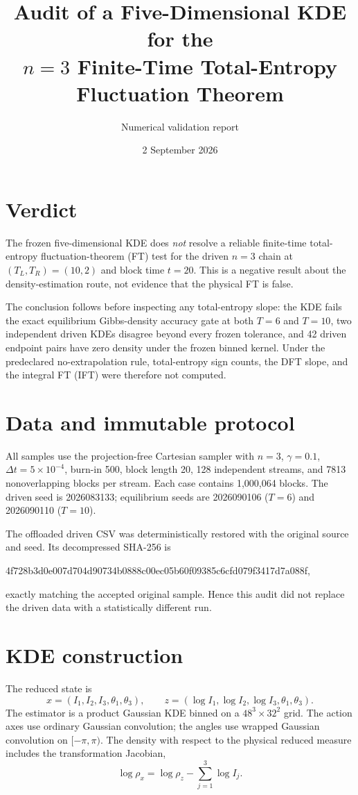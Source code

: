 \documentclass[11pt]{article}
\title{Audit of a Five-Dimensional KDE for the\\
$n=3$ Finite-Time Total-Entropy Fluctuation Theorem}
\author{Numerical validation report}
\date{2 September 2026}
\begin{document}
\maketitle

\section*{Verdict}

The frozen five-dimensional KDE does \emph{not} resolve a reliable finite-time
total-entropy fluctuation-theorem (FT) test for the driven $n=3$ chain at
$(T_L,T_R)=(10,2)$ and block time $t=20$.  This is a negative result about the
density-estimation route, not evidence that the physical FT is false.

The conclusion follows before inspecting any total-entropy slope: the KDE
fails the exact equilibrium Gibbs-density accuracy gate at both $T=6$ and
$T=10$, two independent driven KDEs disagree beyond every frozen tolerance,
and 42 driven endpoint pairs have zero density under the frozen binned kernel.
Under the predeclared no-extrapolation rule, total-entropy sign counts, the DFT
slope, and the integral FT (IFT) were therefore not computed.

\section{Data and immutable protocol}

All samples use the projection-free Cartesian sampler with $n=3$,
$\gamma=0.1$, $\Delta t=5\times10^{-4}$, burn-in 500, block length 20,
128 independent streams, and 7813 nonoverlapping blocks per stream.  Each case
contains 1,000,064 blocks.  The driven seed is 2026083133; equilibrium seeds
are 2026090106 ($T=6$) and 2026090110 ($T=10$).

The offloaded driven CSV was deterministically restored with the original
source and seed.  Its decompressed SHA-256 is
\begin{center}
\ttfamily\small
4f728b3d0e007d704d90734b0888c00ec05b60f09385c6cfd079f3417d7a088f,
\end{center}
exactly matching the accepted original sample.  Hence this audit did not
replace the driven data with a statistically different run.

\section{KDE construction}

The reduced state is
\[
x=(I_1,I_2,I_3,\theta_1,\theta_3),
\qquad
z=(\log I_1,\log I_2,\log I_3,\theta_1,\theta_3).
\]
The estimator is a product Gaussian KDE binned on a
$48^3\times32^2$ grid.  The action axes use ordinary Gaussian convolution;
the angles use wrapped Gaussian convolution on $[-\pi,\pi)$.  The density with
respect to the physical reduced measure includes the transformation Jacobian,
\[
\log\rho_x=\log\rho_z-\sum_{j=1}^3\log I_j.
\]
\end{document}

